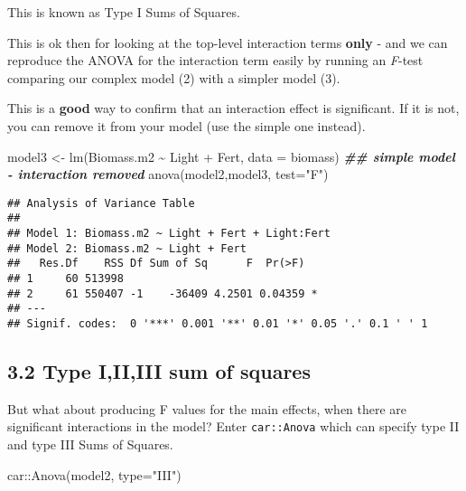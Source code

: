 \documentclass[
]{article}
\newenvironment{Shaded}{\begin{snugshade}}{\end{snugshade}}
\newcommand{\AttributeTok}[1]{\textcolor[rgb]{0.77,0.63,0.00}{#1}}
\newcommand{\DocumentationTok}[1]{\textcolor[rgb]{0.56,0.35,0.01}{\textbf{\textit{#1}}}}
\newcommand{\FunctionTok}[1]{\textcolor[rgb]{0.00,0.00,0.00}{#1}}
\newcommand{\NormalTok}[1]{#1}
\newcommand{\OtherTok}[1]{\textcolor[rgb]{0.56,0.35,0.01}{#1}}
\newcommand{\SpecialCharTok}[1]{\textcolor[rgb]{0.00,0.00,0.00}{#1}}
\newcommand{\StringTok}[1]{\textcolor[rgb]{0.31,0.60,0.02}{#1}}
\begin{document}
This is known as Type I Sums of Squares.

This is ok then for looking at the top-level interaction terms
\textbf{only} - and we can reproduce the ANOVA for the interaction term
easily by running an \emph{F}-test comparing our complex model (2) with
a simpler model (3).

This is a \textbf{good} way to confirm that an interaction effect is
significant. If it is not, you can remove it from your model (use the
simple one instead).

\begin{Shaded}
\begin{Highlighting}[]
\NormalTok{model3 }\OtherTok{\textless{}{-}} \FunctionTok{lm}\NormalTok{(Biomass.m2 }\SpecialCharTok{\textasciitilde{}}\NormalTok{ Light }\SpecialCharTok{+}\NormalTok{ Fert, }\AttributeTok{data =}\NormalTok{ biomass) }\DocumentationTok{\#\# simple model {-} interaction removed}
\FunctionTok{anova}\NormalTok{(model2,model3, }\AttributeTok{test=}\StringTok{"F"}\NormalTok{)}
\end{Highlighting}
\end{Shaded}

\begin{verbatim}
## Analysis of Variance Table
## 
## Model 1: Biomass.m2 ~ Light + Fert + Light:Fert
## Model 2: Biomass.m2 ~ Light + Fert
##   Res.Df    RSS Df Sum of Sq      F  Pr(>F)  
## 1     60 513998                              
## 2     61 550407 -1    -36409 4.2501 0.04359 *
## ---
## Signif. codes:  0 '***' 0.001 '**' 0.01 '*' 0.05 '.' 0.1 ' ' 1
\end{verbatim}

\hypertarget{type-iiiiii-sum-of-squares}{%
\subsection{3.2 Type I,II,III sum of
squares}\label{type-iiiiii-sum-of-squares}}

But what about producing F values for the main effects, when there are
significant interactions in the model? Enter \texttt{car::Anova} which
can specify type II and type III Sums of Squares.

\begin{Shaded}
\begin{Highlighting}[]
\NormalTok{car}\SpecialCharTok{::}\FunctionTok{Anova}\NormalTok{(model2, }\AttributeTok{type=}\StringTok{"III"}\NormalTok{)}
\end{Highlighting}
\end{Shaded}
\end{document}
